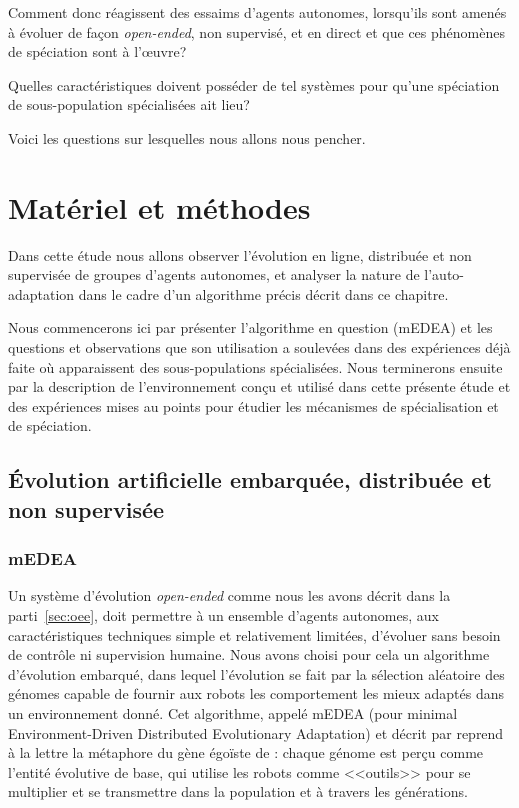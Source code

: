 \documentclass[a4paper,10pt]{report}
\begin{document}
Comment donc réagissent des essaims d'agents autonomes, lorsqu'ils sont amenés à évoluer de fa\c con \emph{open-ended}, non supervisé, et en direct et que ces phénomènes de spéciation sont à l'\oe uvre? 

Quelles caractéristiques doivent posséder de tel systèmes pour qu'une spéciation de sous-population spécialisées ait lieu?

Voici les questions sur lesquelles nous allons nous pencher.

\chapter{Matériel et méthodes }\label{ch:materiel}


Dans cette étude nous allons observer l'évolution en ligne, distribuée et non supervisée de groupes d'agents autonomes, et analyser la nature de l'auto-adaptation dans le cadre d'un algorithme précis décrit dans ce chapitre.

Nous commencerons ici par présenter l'algorithme en question (mEDEA) et les questions et observations que son utilisation a soulevées dans des expériences déjà faite où apparaissent des sous-populations spécialisées. Nous terminerons ensuite par la description de l'environnement con\c cu et utilisé dans cette présente étude et des expériences mises au points pour étudier les mécanismes de spécialisation et de spéciation.


\section{\'{E}volution artificielle embarquée, distribuée et non supervisée }
\label{sec:algo}



\subsection{mEDEA \citep{bredeche11mcmds}}
Un système d'évolution \emph{open-ended} comme nous les avons décrit dans la parti~\ref{sec:oee}, doit permettre à un ensemble d'agents autonomes, aux caractéristiques techniques simple et relativement limitées, d'évoluer sans besoin de contrôle ni supervision humaine. Nous avons choisi pour cela un algorithme d'évolution embarqué, dans lequel l'évolution se fait par la sélection aléatoire des génomes capable de fournir aux robots les comportement les mieux adaptés dans un environnement donné. 
Cet algorithme, appelé mEDEA (pour minimal Environment-Driven Distributed Evolutionary Adaptation) et décrit par \cite{bredeche11mcmds} reprend à la lettre la métaphore du gène égoïste de \cite{dawkins76selfishgene} : chaque génome est perçu comme l'entité évolutive de base, qui utilise les robots comme <<outils>> pour se multiplier et se transmettre dans la population et à travers les générations.
\end{document}
